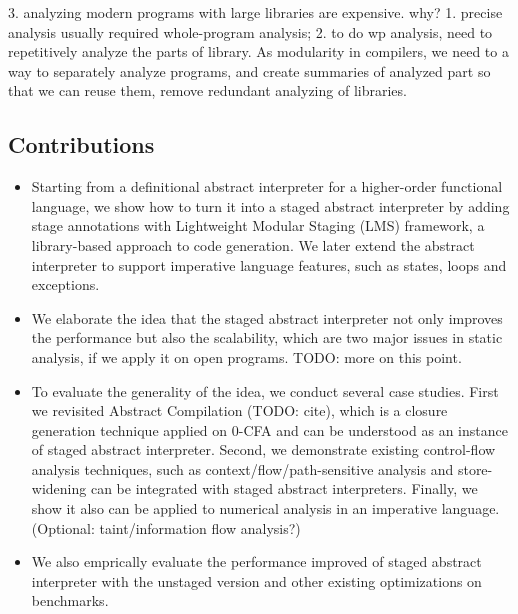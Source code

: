 3. analyzing modern programs with large libraries are expensive. 
why? 1. precise analysis usually required whole-program analysis; 2. to do wp analysis, need to 
repetitively analyze the parts of library.
As modularity in compilers, we need to a way to separately analyze programs, and create summaries of analyzed 
part so that we can reuse them, remove redundant analyzing of libraries.

\subsection{Contributions}

\begin{itemize}
\item Starting from a definitional abstract interpreter for a higher-order functional language,
  we show how to turn it into a staged abstract interpreter by adding stage annotations with 
  Lightweight Modular Staging (LMS) framework, a library-based approach to code generation. 
  We later extend the abstract interpreter to support
  imperative language features, such as states, loops and exceptions.
\item We elaborate the idea that the staged abstract interpreter not only improves the performance 
  but also the scalability, which are two major issues in static analysis, if we apply it on open
  programs. TODO: more on this point.
\item To evaluate the generality of the idea, we conduct several case studies. 
  First we revisited Abstract Compilation (TODO: cite), which is a closure generation technique applied 
  on 0-CFA and can be understood as an instance of staged abstract interpreter. 
  Second, we demonstrate existing control-flow analysis techniques, such as context/flow/path-sensitive 
  analysis and store-widening can be integrated with staged abstract interpreters.
  Finally, we show it also can be applied to numerical analysis in an imperative language.
  (Optional: taint/information flow analysis?)
\item We also emprically evaluate the performance improved of staged abstract interpreter with the
  unstaged version and other existing optimizations on benchmarks.
\end{itemize}
